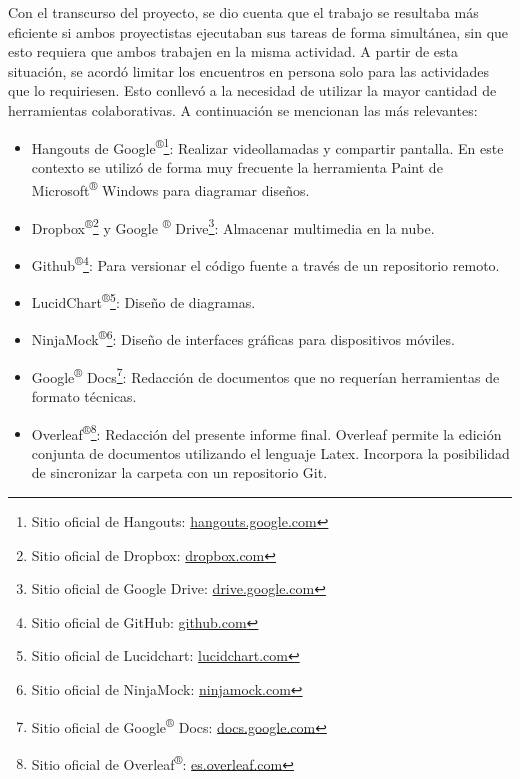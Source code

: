         \par Con el transcurso del proyecto, se dio cuenta que el trabajo se resultaba más eficiente si ambos proyectistas ejecutaban sus tareas de forma simultánea, sin que esto requiera que ambos trabajen en la misma actividad. A partir de esta situación, se acordó limitar los encuentros en persona solo para las actividades que lo requiriesen. Esto conllevó a la necesidad de utilizar la mayor cantidad de herramientas colaborativas. A continuación se mencionan las más relevantes:
        \begin{itemize}
            
            \item Hangouts de Google\textsuperscript{®}\footnote{ Sitio oficial de Hangouts: \url{hangouts.google.com}}: Realizar videollamadas y compartir pantalla. En este contexto se utilizó de forma muy frecuente la herramienta Paint de Microsoft\textsuperscript{®} Windows para diagramar diseños.
            
            \item Dropbox\textsuperscript{®}\footnote{ Sitio oficial de Dropbox: \url{dropbox.com}} y Google \textsuperscript{®} Drive\footnote{ Sitio oficial de Google Drive: \url{drive.google.com}}: Almacenar multimedia en la nube.
            
            \item Github\textsuperscript{®}\footnote{ Sitio oficial de GitHub: \url{github.com}}: Para versionar el código fuente a través de un repositorio remoto.
            
            \item LucidChart\textsuperscript{®}\footnote{ Sitio oficial de Lucidchart: \url{lucidchart.com}}: Diseño de diagramas.
            
            \item NinjaMock\textsuperscript{®}\footnote{ Sitio oficial de NinjaMock: \url{ninjamock.com}}: Diseño de interfaces gráficas para dispositivos móviles.
            
            \item Google\textsuperscript{®} Docs\footnote{ Sitio oficial de Google\textsuperscript{®} Docs: \url{docs.google.com}}: Redacción de documentos que no requerían herramientas de formato técnicas.
            
            \item Overleaf\textsuperscript{®}\footnote{ Sitio oficial de Overleaf\textsuperscript{®}: \url{es.overleaf.com}}: Redacción del presente informe final. Overleaf permite la edición conjunta de documentos utilizando el lenguaje Latex. Incorpora la posibilidad de sincronizar la carpeta con un repositorio Git.
            
        \end{itemize}
        
